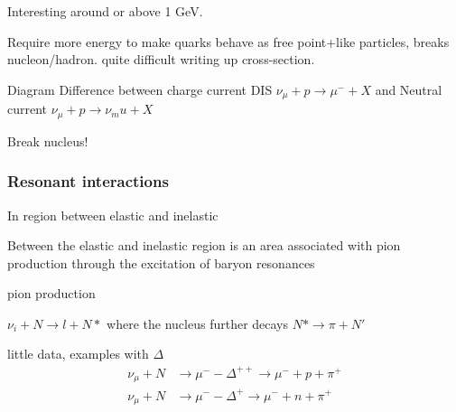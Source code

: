 Interesting around or above 1 GeV.

Require more energy to make quarks behave as free point+like particles, breaks nucleon/hadron. quite difficult writing up cross-section. 

Diagram Difference between charge current DIS $\nu_\mu + p \rightarrow \mu^- + X$ and Neutral current $\nu_\mu + p \rightarrow \nu_mu + X$


Break nucleus!

\subsubsection{Resonant interactions}
In region between elastic and inelastic

Between the elastic and inelastic region is an area associated with pion production through the excitation of baryon resonances

pion production

$\nu_i + N \rightarrow l + N*$ where the nucleus further decays $N* \rightarrow \pi + N'$

little data, examples with $\Delta$
\begin{align}
\nu_\mu + N &\rightarrow \mu^- - \Delta^{++} \rightarrow \mu^- + p + \pi^+\\
\nu_\mu + N &\rightarrow \mu^- - \Delta^{+} \rightarrow \mu^- + n + \pi^+
\end{align}

